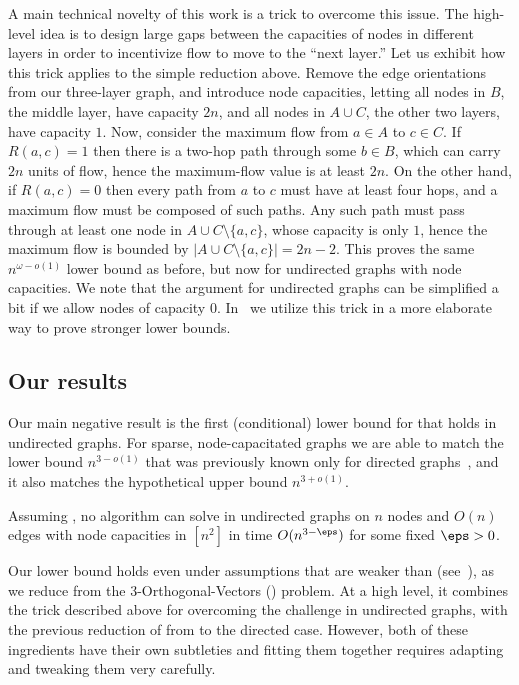 A main technical novelty of this work is a trick to overcome this issue. The high-level idea is to design large gaps between the capacities of nodes in different layers in order to incentivize flow to move to the ``next layer.''
Let us exhibit how this trick applies to the simple reduction above.
Remove the edge orientations from our three-layer graph,
and introduce node capacities,
letting all nodes in $B$, the middle layer, have capacity $2n$,
and all nodes in $A \cup C$, the other two layers, have capacity $1$.
Now, consider the maximum flow from $a \in A$ to $c \in C$.
If $R(a,c)=1$ then there is a two-hop path through some $b \in B$,
which can carry $2n$ units of flow,
hence the maximum-flow value is at least $2n$.
On the other hand, if $R(a,c)=0$ then every path from $a$ to $c$
must have at least four hops, and a maximum flow must be composed of such paths.
Any such path must pass through at least one node in
$A \cup C\setminus\{a,c\}$, whose capacity is only $1$,
hence the maximum flow is bounded by $|A \cup C \setminus \{ a,c \}| = 2n-2$.
This proves the same $n^{\omega-o(1)}$ lower bound as before,
but now for undirected graphs with node capacities.
We note that the argument for undirected graphs can be simplified a bit if we allow nodes of capacity $0$.
In~ we utilize this trick in a more elaborate way to prove stronger lower bounds.

\subsection{Our results}

Our main negative result is the first (conditional) lower bound for \APMF that holds in undirected graphs.
For sparse, node-capacitated graphs we are able to match the lower bound $n^{3-o(1)}$ that was previously known only for directed graphs~\cite{KT18},
and it also matches the hypothetical upper bound $n^{3+o(1)}$.

\begin{theorem}
\label{thm1}
Assuming \SETH, no algorithm can solve \APMF in undirected graphs on $n$ nodes and $O(n)$ edges with node capacities in $[n^2]$ in time $O(n^{3-\eps})$
for some fixed $\eps>0$.
\end{theorem}

Our lower bound holds even under assumptions that are weaker than \SETH (see~), as we reduce from the $3$-Orthogonal-Vectors (\TOV) problem.
At a high level, it combines the trick described above for overcoming the challenge in undirected graphs, with the previous reduction of \cite{KT18} from \TOV to the directed case.
However, both of these ingredients have their own subtleties and fitting them together requires adapting and tweaking them very carefully.

